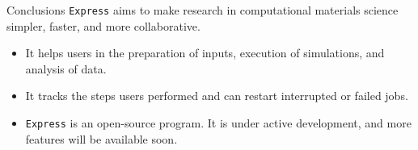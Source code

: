 \begin{frame}{Conclusions}
    \texttt{Express} aims to make research in computational materials science
    simpler, faster, and more collaborative.
    \begin{itemize}
        \item It helps users in the preparation of inputs, execution of simulations, and analysis of data.
        \item It tracks the steps users performed and can restart interrupted or failed jobs.
        \item \texttt{Express} is an open-source program. It
              is under active development, and more features will be available soon.
    \end{itemize}
\end{frame}
